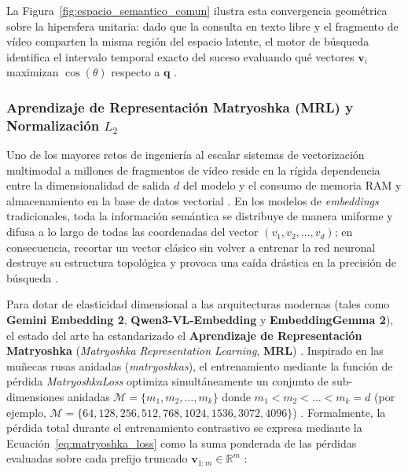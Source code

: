 La Figura~\ref{fig:espacio_semantico_comun} ilustra esta convergencia geométrica sobre la hipersfera unitaria: dado que la consulta en texto libre y el fragmento de vídeo comparten la misma región del espacio latente, el motor de búsqueda identifica el intervalo temporal exacto del suceso evaluando qué vectores $\mathbf{v}_i$ maximizan $\cos(\theta)$ respecto a $\mathbf{q}$ \cite{gemini_emb2_docs}.

\subsubsection{Aprendizaje de Representación Matryoshka (MRL) y Normalización $L_2$}
\label{subsubsec:matryoshka_mrl}

Uno de los mayores retos de ingeniería al escalar sistemas de vectorización multimodal a millones de fragmentos de vídeo reside en la rígida dependencia entre la dimensionalidad de salida $d$ del modelo y el consumo de memoria RAM y almacenamiento en la base de datos vectorial \cite{learnopencv_qwen3, qwen3_vl_emb2026}. En los modelos de \textit{embeddings} tradicionales, toda la información semántica se distribuye de manera uniforme y difusa a lo largo de todas las coordenadas del vector $(v_1, v_2, \dots, v_d)$; en consecuencia, recortar un vector clásico sin volver a entrenar la red neuronal destruye su estructura topológica y provoca una caída drástica en la precisión de búsqueda \cite{learnopencv_qwen3}.

Para dotar de elasticidad dimensional a las arquitecturas modernas (tales como \textbf{Gemini Embedding 2}, \textbf{Qwen3-VL-Embedding} y \textbf{EmbeddingGemma 2}), el estado del arte ha estandarizado el \textbf{Aprendizaje de Representación Matryoshka} (\textit{Matryoshka Representation Learning}, \textbf{MRL}) \cite{gemini_emb2_docs, qwen3_vl_emb2026}. Inspirado en las muñecas rusas anidadas (\textit{matryoshkas}), el entrenamiento mediante la función de pérdida \textit{MatryoshkaLoss} optimiza simultáneamente un conjunto de sub-dimensiones anidadas $\mathcal{M} = \{m_1, m_2, \dots, m_k\}$ donde $m_1 < m_2 < \dots < m_k = d$ (por ejemplo, $\mathcal{M} = \{64, 128, 256, 512, 768, 1024, 1536, 3072, 4096\}$) \cite{learnopencv_qwen3, gemini_emb2_docs, qwen3_vl_emb2026}. Formalmente, la pérdida total durante el entrenamiento contrastivo se expresa mediante la Ecuación~\eqref{eq:matryoshka_loss} como la suma ponderada de las pérdidas evaluadas sobre cada prefijo truncado $\mathbf{v}_{1:m} \in \mathbb{R}^m$ \cite{learnopencv_qwen3}:

